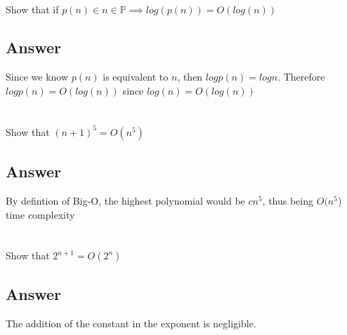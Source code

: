 \documentclass{article}
\begin{document}
\section{}

Show that if \(p(n) \in n \in \mathbb{P} \implies log(p(n)) = O(log(n)) \)

\subsection{Answer}

\begin{mdframed}

  Since we know \(p(n)\) is equivalent to \(n\), then \(log p(n) = log n\).
  Therefore \(log p(n) = O(log(n))\) since \(log(n) = O(log(n))\)

\end{mdframed}


\section{}

Show that \((n+1)^5 = O(n^5) \)

\subsection{Answer}

\begin{mdframed}

  By defintion of Big-O, the highest polynomial would be \(cn^5\), thus being
  \(O(n^5\)) time complexity

\end{mdframed}


\section{}

Show that \(2^{n+1} = O(2^n) \)

\subsection{Answer}

\begin{mdframed}
  
  The addition of the constant in the exponent is negligible.

\end{mdframed}
\end{document}
